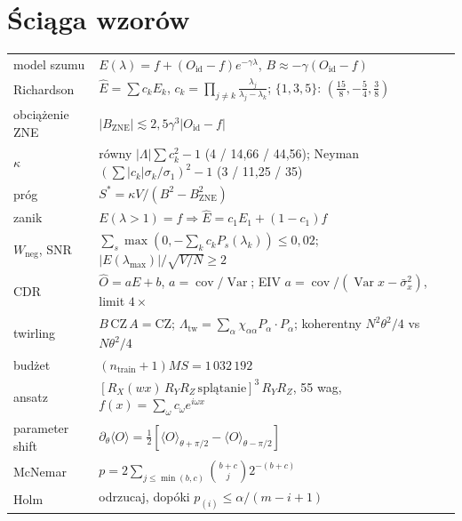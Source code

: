 \documentclass[11pt,a4paper]{article}
\newcommand{\ev}[1]{\langle #1\rangle}
\newcommand{\Oid}{O_{\mathrm{id}}}
\newcommand{\Var}{\operatorname{Var}}
\newcommand{\Cov}{\operatorname{cov}}
\newcommand{\CZ}{\mathrm{CZ}}
\begin{document}
\clearpage
\appendix
\section*{Ściąga wzorów}
\begin{center}
\renewcommand{\arraystretch}{1.45}
\begin{tabular}{@{}p{3.6cm}p{11.4cm}@{}}
\toprule
model szumu & $E(\lambda)=f+(\Oid-f)e^{-\gamma\lambda}$, $B\approx-\gamma(\Oid-f)$ \\
Richardson & $\hat E=\sum c_kE_k$, $c_k=\prod_{j\ne k}\frac{\lambda_j}{\lambda_j-\lambda_k}$; $\{1,3,5\}$: $(\frac{15}8,-\frac54,\frac38)$ \\
obciążenie ZNE & $|B_{\text{ZNE}}|\lesssim2{,}5\gamma^3|\Oid-f|$ \\
$\kappa$ & równy $|\Lambda|\sum c_k^2-1$ (4 / 14,66 / 44,56); Neyman $(\sum|c_k|\sigma_k/\sigma_1)^2-1$ (3 / 11,25 / 35) \\
próg & $S^*=\kappa V/(B^2-B_{\text{ZNE}}^2)$ \\
zanik & $E(\lambda>1)=f\Rightarrow\hat E=c_1E_1+(1-c_1)f$ \\
$W_{\text{neg}}$, SNR & $\sum_s\max(0,-\sum_kc_kP_s(\lambda_k))\le0{,}02$; $|E(\lambda_{\max})|/\sqrt{V/N}\ge2$ \\
CDR & $\hat O=aE+b$, $a=\Cov/\Var$; EIV $a=\Cov/(\Var x-\bar\sigma_x^2)$, limit $4\times$ \\
twirling & $B\,\CZ\,A=\CZ$; $\Lambda_{\text{tw}}=\sum_\alpha\chi_{\alpha\alpha}P_\alpha\cdot P_\alpha$; koherentny $N^2\theta^2/4$ vs $N\theta^2/4$ \\
budżet & $(n_{\text{train}}+1)MS=1\,032\,192$ \\
ansatz & $[R_X(wx)\,R_YR_Z\,\text{splątanie}]^{3}\,R_YR_Z$, 55 wag, $f(x)=\sum_{\omega}c_\omega e^{i\omega x}$ \\
parameter shift & $\partial_\theta\ev O=\frac12[\ev O_{\theta+\pi/2}-\ev O_{\theta-\pi/2}]$ \\
McNemar & $p=2\sum_{j\le\min(b,c)}\binom{b+c}j2^{-(b+c)}$ \\
Holm & odrzucaj, dopóki $p_{(i)}\le\alpha/(m-i+1)$ \\
\bottomrule
\end{tabular}
\end{center}
\end{document}
